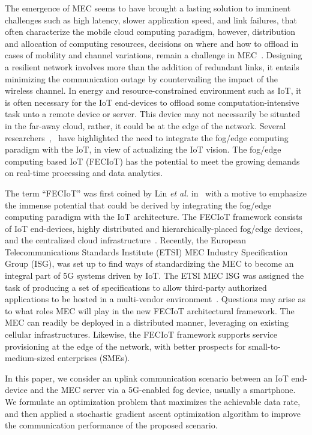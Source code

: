 \documentclass[conference,compsoc]{IEEEtran}
\theoremstyle{definition}
\begin{document}
The emergence of MEC seems to have brought a lasting solution to imminent challenges such as high latency, slower application speed, and link failures, that often characterize the mobile cloud computing paradigm, however, distribution and allocation of computing resources, decisions on where and how to offload in cases of mobility and channel variations, remain a challenge in MEC~\cite{Yu2016}.
Designing a resilient network involves more than the addition of redundant links, it entails minimizing the communication outage by countervailing the impact of the wireless channel. In energy and resource-constrained environment such as IoT, it is often necessary for the IoT end-devices to offload some computation-intensive task unto a remote device or server. This device may not necessarily be situated in the far-away cloud, rather, it could be at the edge of the network. Several researchers~\cite{Lin16},~\cite{Chiang16} have highlighted the need to integrate the fog/edge computing paradigm with the IoT, in view of actualizing the IoT vision. The fog/edge computing based IoT (FECIoT) has the potential to meet the growing demands on real-time processing and data analytics.

The term ``FECIoT'' was first coined by Lin \textit{et al.} in~\cite{Lin16} with a motive to emphasize the immense potential that could be derived by integrating the fog/edge computing paradigm with the IoT architecture. The FECIoT framework consists of IoT end-devices, highly distributed and hierarchically-placed fog/edge devices, and the centralized cloud infrastructure~\cite{Chiang16}. Recently, the European Telecommunications Standards Institute (ETSI) MEC Industry Specification Group (ISG), was set up to find ways of standardizing the MEC to become an integral part of 5G systems driven by IoT. The ETSI MEC ISG was assigned the task of producing a set of specifications to allow third-party authorized applications to be hosted in a multi-vendor environment~\cite{Sabella16}. Questions may arise as to what roles MEC will play in the new FECIoT architectural framework. The MEC can readily be deployed in a distributed manner, leveraging on existing cellular infrastructures. Likewise, the FECIoT framework supports service provisioning at the edge of the network, with better prospects for small-to-medium-sized enterprises (SMEs).



In this paper, we consider an uplink communication scenario between an IoT end-device and the MEC server via a 5G-enabled fog device, usually a smartphone. We formulate an optimization problem that maximizes the achievable data rate, and then applied a stochastic gradient ascent optimization algorithm to improve the communication performance of the proposed scenario.
\end{document}
